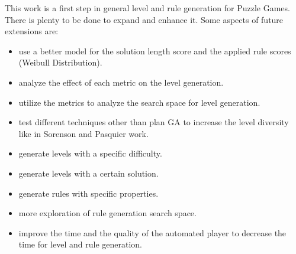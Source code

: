 This work is a first step in general level and rule generation for Puzzle Games. There is plenty to be done to expand and enhance it. Some aspects of future extensions are:
\begin{itemize} \itemsep0pt \parskip0pt 
	\item use a better model for the solution length score and the applied rule scores (Weibull Distribution).
	\item analyze the effect of each metric on the level generation.
	\item utilize the metrics to analyze the search space for level generation.
	\item test different techniques other than plan GA to increase the level diversity like in Sorenson and Pasquier work\cite{genericLevelFramework}.
	\item generate levels with a specific difficulty.
	\item generate levels with a certain solution.
	\item generate rules with specific properties.
	\item more exploration of rule generation search space.
	\item improve the time and the quality of the automated player to decrease the time for level and rule generation.
\end{itemize}
